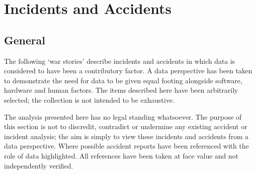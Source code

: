 %
%
\chapter{Incidents and Accidents} \label{bkm:accidents}

\section{General}
The following `war stories' describe incidents and accidents in which data is considered to have been a contributory factor. A data perspective has been taken to demonstrate the need for data to be given equal footing alongside software, hardware and human factors. The items described here have been arbitrarily selected; the collection is not intended to be exhaustive.

 The analysis presented here has no legal standing whatsoever. The purpose of this section is not to discredit, contradict or undermine any existing accident or incident analysis; the aim is simply to view these incidents and accidents from a data perspective. Where possible accident reports have been referenced with the role of data highlighted. All references have been taken at face value and not independently verified.

